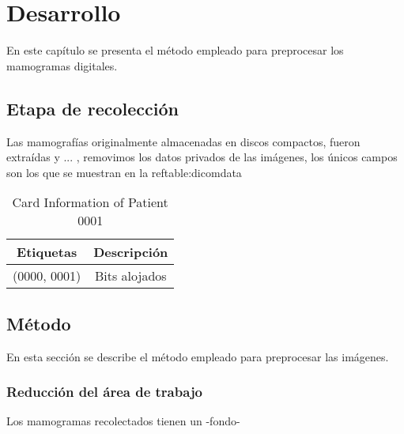 \chapter{Desarrollo}
En este capítulo se presenta el método empleado para preprocesar los mamogramas
digitales.

\section{Etapa de recolección}
Las mamografías originalmente almacenadas en discos compactos, fueron extraídas
y ... , removimos los datos privados de las imágenes, los únicos campos son los
que se muestran en la ref{table:dicomdata} 

\begin{table}
  \caption{Card Information of Patient 0001} 
  \label{examplecard}
\begin{center}
{\small
    \begin{tabular}{c|c}
    \hline

    {\bf Etiquetas} & 
    {\bf Descripción} \\
    \hline
           (0000, 0001) & Bits alojados \\
    \hline
    \end{tabular}
}
\end{center}
\end{table}


\section{Método}
En esta sección se describe el método empleado para preprocesar las imágenes.

\subsection{Reducción del área de trabajo}
Los mamogramas recolectados tienen un -fondo-


